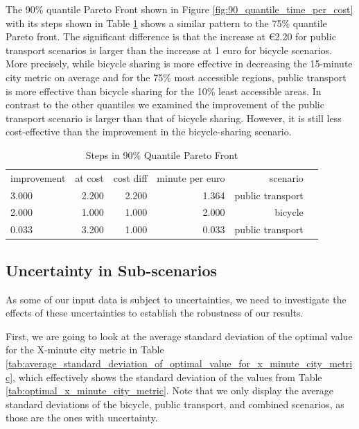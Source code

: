 The 90\% quantile Pareto Front shown in Figure \ref{fig:90_quantile_time_per_cost} with its steps shown in Table \ref{tab:differences_in_90_quantile_pareto_front} shows a similar pattern to the 75\% quantile Pareto front.
The significant difference is that the increase at \euro{2.20} for public transport scenarios is larger than the increase at 1 euro for bicycle scenarios.
More precisely, while bicycle sharing is more effective in decreasing the 15-minute city metric on average and for the 75\% most accessible regions, public transport is more effective than bicycle sharing for the 10\% least accessible areas.
In contrast to the other quantiles we examined the improvement of the public transport scenario is larger than that of bicycle sharing. 
However, it is still less cost-effective than the improvement in the bicycle-sharing scenario.


\begin{table}
  \caption{Steps in 90\% Quantile Pareto Front}
  \label{tab:differences_in_90_quantile_pareto_front}
  \begin{center}
    \begin{tabular}{lrrrrl}
     improvement & at cost & cost diff & minute per euro & scenario \\
     3.000 & 2.200 & 2.200 & 1.364 & public transport \\
     2.000 & 1.000 & 1.000 & 2.000 & bicycle \\
     0.033 & 3.200 & 1.000 & 0.033 & public transport \\
    \end{tabular}
  \end{center}
\end{table}


\subsection{Uncertainty in Sub-scenarios}
\label{subsec:uncertainty_subscenarios}

As some of our input data is subject to uncertainties, we need to investigate the effects of these uncertainties to establish the robustness of our results.

First, we are going to look at the average standard deviation of the optimal value for the X-minute city metric in Table \ref{tab:average_standard_deviation_of_optimal_value_for_x_minute_city_metric}, which effectively shows the standard deviation of the values from Table \ref{tab:optimal_x_minute_city_metric}.
Note that we only display the average standard deviations of the bicycle, public transport, and combined scenarios, as those are the ones with uncertainty.

